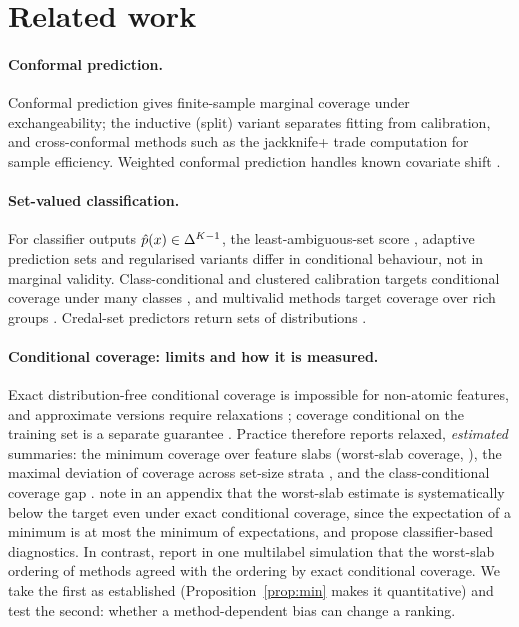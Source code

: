 \section{Related work}
\label{sec:related}

\paragraph{Conformal prediction.}
Conformal prediction \citep{vovk2005algorithmic} gives finite-sample marginal coverage under exchangeability; the inductive (split) variant \citep{papadopoulos2002inductive,lei2018distribution} separates fitting from calibration, and cross-conformal methods such as the jackknife+ \citep{barber2021predictive} trade computation for sample efficiency.
Weighted conformal prediction handles known covariate shift \citep{tibshirani2019conformal}.

\paragraph{Set-valued classification.}
For classifier outputs $\hat p(x)\in\Delta^{K-1}$, the least-ambiguous-set score \citep{sadinle2019least}, adaptive prediction sets \citep{romano2020classification} and regularised variants \citep{angelopoulos2021uncertainty} differ in conditional behaviour, not in marginal validity.
Class-conditional and clustered calibration targets conditional coverage under many classes \citep{ding2023class}, and multivalid methods target coverage over rich groups \citep{jung2023batch}.
Credal-set predictors return sets of distributions \citep{javanmardi2024conformalized}.

\paragraph{Conditional coverage: limits and how it is measured.}
Exact distribution-free conditional coverage is impossible for non-atomic features, and approximate versions require relaxations \citep{vovk2012conditional,barber2021limits}; coverage conditional on the training set is a separate guarantee \citep{bian2023training}.
Practice therefore reports relaxed, \emph{estimated} summaries: the minimum coverage over feature slabs (worst-slab coverage, \citealp{cauchois2020knowing}), the maximal deviation of coverage across set-size strata \citep{angelopoulos2021uncertainty}, and the class-conditional coverage gap \citep{ding2023class}.
\citet{braun2025diagnostics} note in an appendix that the worst-slab estimate is systematically below the target even under exact conditional coverage, since the expectation of a minimum is at most the minimum of expectations, and propose classifier-based diagnostics.
In contrast, \citet{cauchois2020knowing} report in one multilabel simulation that the worst-slab ordering of methods agreed with the ordering by exact conditional coverage.
We take the first as established (Proposition~\ref{prop:min} makes it quantitative) and test the second: whether a method-dependent bias can change a ranking.

